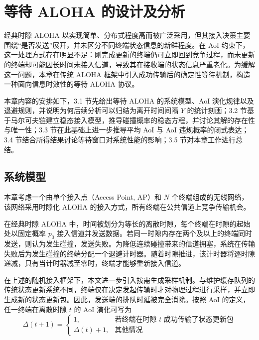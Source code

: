 \clearpage


\section{等待 ALOHA 的设计及分析}

经典时隙 ALOHA 以实现简单、分布式程度高而被广泛采用，但其接入决策主要围绕“是否发送”展开，并未区分不同终端状态信息的新鲜程度。在 AoI 约束下，这一处理方式存在明显不足：刚完成更新的终端仍可立即回到竞争过程，而未更新的终端却可能因长时间未接入信道，导致其在接收端的状态信息严重老化。为缓解这一问题，本章在传统 ALOHA 框架中引入成功传输后的确定性等待机制，构造一种面向信息时效性的等待 ALOHA 协议。

本章内容的安排如下，3.1 节先给出等待 ALOHA 的系统模型、AoI 演化规律以及退避规则，并说明为何后续分析可以归结为离开时间间隔 $Y$ 的统计刻画；3.2 节基于马尔可夫链建立稳态接入模型，推导碰撞概率的稳态方程，并讨论其解的存在性与唯一性；3.3 节在此基础上进一步推导平均 AoI 与 AoI 违规概率的闭式表达；3.4 节结合所得结果讨论等待窗口对系统性能的影响；3.5 节对本章工作进行总结。

\subsection{系统模型}

本章考虑一个由单个接入点（Access Point, AP）和 $N$ 个终端组成的无线网络，该网络采用时隙化 ALOHA 的接入方式，所有终端在公共信道上竞争传输机会。

在经典时隙 ALOHA 中，时间被划分为等长的离散时隙，每个终端在时隙的起始处以固定概率 $p_0$ 接入信道并发送数据。若同一时隙内存在两个及以上的终端同时发送，则认为发生碰撞，发送失败。为降低连续碰撞带来的信道拥塞，系统在传输失败后为发生碰撞的终端分配一个退避计时器。随着时隙推进，该计时器将逐时隙递减，只有当计时器减至零时，终端才能够重新接入信道。

在上述的随机接入框架下，本文进一步引入按需生成采样机制。与维护缓存队列的传统状态更新系统不同，终端仅在决定发起传输时才对物理过程进行采样，并立即生成新的状态更新包。因此，发送端的排队时延被完全消除。按照 AoI 的定义，任一终端在离散时隙 $t$ 的 AoI 演化可写为
\begin{equation}
    \label{eq:aoi_evolution}
    \Delta(t+1) =
    \begin{cases}
        1, & \text{若终端在时隙 } t \text{ 成功传输了状态更新包} \\
        \Delta(t) + 1, & \text{其他情况}
    \end{cases}
\end{equation}

